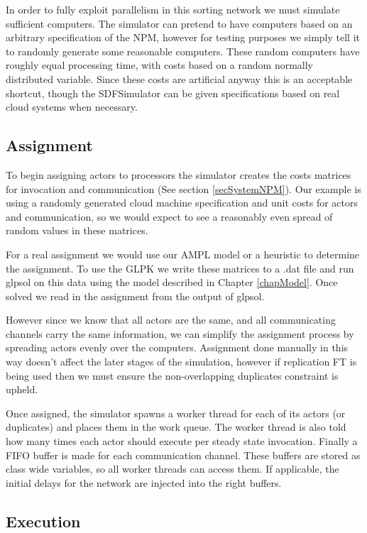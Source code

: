 In order to fully exploit parallelism in this sorting network we must simulate sufficient computers.
The simulator can pretend to have computers based on an arbitrary specification of the NPM, however for testing purposes we simply tell it to randomly generate some reasonable computers.
These random computers have roughly equal processing time, with costs based on a random normally distributed variable.
Since these costs are artificial anyway this is an acceptable shortcut, though the SDFSimulator can be given specifications based on real cloud systems when necessary.

\subsection{Assignment}

To begin assigning actors to processors the simulator creates the costs matrices for invocation and communication (See section \ref{secSystemNPM}).
Our example is using a randomly generated cloud machine specification and unit costs for actors and communication, so we would expect to see a reasonably even spread of random values in these matrices.

For a real assignment we would use our AMPL model or a heuristic to determine the assignment.
To use the GLPK we write these matrices to a .dat file and run glpsol on this data using the model described in Chapter \ref{chapModel}.
Once solved we read in the assignment from the output of glpsol.

However since we know that all actors are the same, and all communicating channels carry the same information, we can simplify the assignment process by spreading actors evenly over the computers.
Assignment done manually in this way doesn't affect the later stages of the simulation, however if replication FT is being used then we must ensure the non-overlapping duplicates constraint is upheld.

Once assigned, the simulator spawns a worker thread for each of its actors (or duplicates) and places them in the work queue.
The worker thread is also told how many times each actor should execute per steady state invocation.
Finally a FIFO buffer is made for each communication channel.
These buffers are stored as class wide variables, so all worker threads can access them.
If applicable, the initial delays for the network are injected into the right buffers.

\subsection{Execution}

